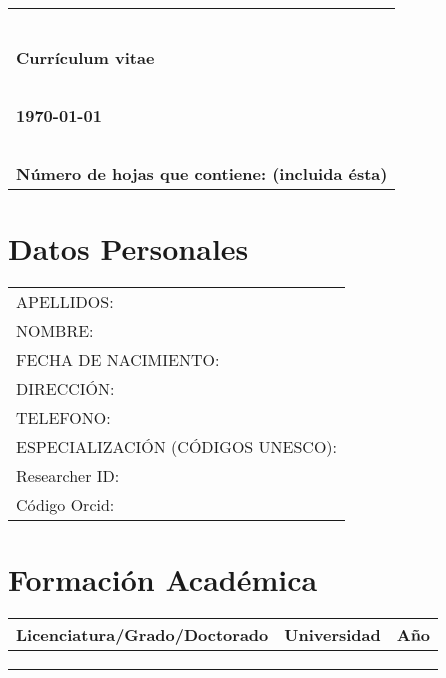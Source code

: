 \documentclass[9pt]{article}
\begin{document}



\thispagestyle{empty}

\mbox{ }

\vspace{4cm}

\begin{tabular}{l}
{\huge\bf }\\
~\\
{\Large\bf Currículum vitae}\\
~\\
{\Large\bf \today}\\
~\\
{\Large \bf Número de hojas que contiene: \pageref{end} (incluida
  ésta)} 
\end{tabular}



\newpage




\tableofcontents

\newpage

\section{Datos Personales}
\begin{tabular}{l}
  APELLIDOS:  \\
  NOMBRE:  \\
  FECHA DE NACIMIENTO:   \\
  DIRECCIÓN:  \\
  TELEFONO:  \\
  ESPECIALIZACIÓN (CÓDIGOS UNESCO):  \\
  Researcher ID:  \\
  Código Orcid: 
\end{tabular}

\section{Formación Académica}
\begin{tabular}{lll}
  Licenciatura/Grado/Doctorado & Universidad & Año \\
  \hline
   &  &  \\
   &  &  \\
   &  & 
\end{tabular}
\end{document}
